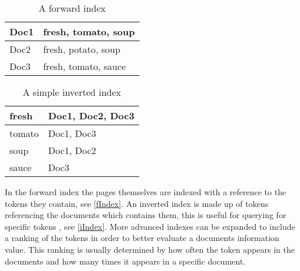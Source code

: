\begin{minipage}{.40\textwidth}
  \centering
  \begin{table}[H]
	\centering
    \begin{tabular}{|l|l|}
\hline
Doc1 & fresh, tomato, soup \\ \hline
Doc2 & fresh, potato, soup \\ \hline
Doc3 & fresh, tomato, sauce \\ \hline
	\end{tabular}
	\label{fIndex}
	\caption{A forward index}
  \end{table}
\end{minipage}
\begin{minipage}{0.5\textwidth}
  \centering
  \begin{table}[H]
	\centering
    \begin{tabular}{|l|l|}
\hline
fresh & Doc1, Doc2, Doc3 \\ \hline
tomato & Doc1, Doc3 \\ \hline
soup & Doc1, Doc2 \\ \hline
sauce & Doc3 \\ \hline
	\end{tabular}
	\label{iIndex}
	\caption{A simple inverted index}
  \end{table}

\end{minipage}

In the forward index the pages themselves are indexed with a reference to the
tokens they contain, see \autoref{fIndex}. An inverted index is made up of
tokens referencing the documents which contains them, this is useful for
querying for specific tokens \citep{Index3}, see \autoref{iIndex}. More advanced
indexes can be expanded to include a ranking of the tokens in order to better
evaluate a documents information value. This ranking is usually determined by
how often the token appears in the documents and how many times it appears in a
specific document.